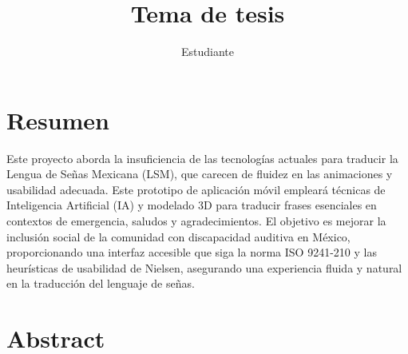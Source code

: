 \documentclass[12pt, letterpaper,oneside]{book}
\title{Tema de tesis}
\author{Estudiante}
\begin{document}
	\renewcommand{\listtablename}{{Índice de tablas}}
	\renewcommand{\tablename}{Tabla}
	

	
\section*{Resumen}
Este proyecto aborda la insuficiencia de las tecnologías actuales para traducir la Lengua de Señas Mexicana (LSM), que carecen de fluidez en las animaciones y usabilidad adecuada. Este prototipo de aplicación móvil empleará técnicas de Inteligencia Artificial (IA) y modelado 3D para traducir frases esenciales en contextos de emergencia, saludos y agradecimientos. El objetivo es mejorar la inclusión social de la comunidad con discapacidad auditiva en México, proporcionando una interfaz accesible que siga la norma ISO 9241-210 y las heurísticas de usabilidad de Nielsen, asegurando una experiencia fluida y natural en la traducción del lenguaje de señas.


\section*{Abstract}
\newpage\null\thispagestyle{empty}\newpage

\tableofcontents
\listoffigures     %
\listoftables      %




%
%
%
\end{document}
